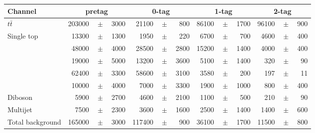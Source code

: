 \begin{table}
  \begin{tabular}{ l  rrr  rrr  rrr  rrr }
    \toprule
    Channel & \multicolumn{3}{c}{\mujets{} pretag} & \multicolumn{3}{c}{\mujets{} 0-tag} & \multicolumn{3}{c}{\mujets{} 1-tag} & \multicolumn{3}{c}{\mujets{} 2-tag} \\
    \midrule      
    $t\bar{t}$                  & 203000 &$\!\!\!\pm\!\!\!$& 3000   & 21100 &$\!\!\!\pm\!\!\!$& 800   & 86100 &$\!\!\!\pm\!\!\!$& 1700 & 96100 &$\!\!\!\pm\!\!\!$& 900  \\
    Single top                  & 13300  &$\!\!\!\pm\!\!\!$& 1300   & 1950 &$\!\!\!\pm\!\!\!$& 220    & 6700 &$\!\!\!\pm\!\!\!$& 700   & 4600 &$\!\!\!\pm\!\!\!$& 400   \\
    \wbb{}                      & 48000  &$\!\!\!\pm\!\!\!$& 4000   & 28500 &$\!\!\!\pm\!\!\!$& 2800  & 15200 &$\!\!\!\pm\!\!\!$& 1400 & 4000 &$\!\!\!\pm\!\!\!$& 400   \\
    \wc{}                       & 19000  &$\!\!\!\pm\!\!\!$& 5000   & 13200 &$\!\!\!\pm\!\!\!$& 3600  & 5100 &$\!\!\!\pm\!\!\!$& 1400  & 320 &$\!\!\!\pm\!\!\!$& 90\\
    \wlight{}                   & 62400  &$\!\!\!\pm\!\!\!$& 3300   & 58600 &$\!\!\!\pm\!\!\!$& 3100  & 3580 &$\!\!\!\pm\!\!\!$& 200   & 197 &$\!\!\!\pm\!\!\!$& 11  \\   
    \zjets{}                    & 10000  &$\!\!\!\pm\!\!\!$& 4000   & 7000 &$\!\!\!\pm\!\!\!$& 3300   & 1900 &$\!\!\!\pm\!\!\!$& 1000  & 800 &$\!\!\!\pm\!\!\!$& 400\\
    Diboson                     & 5900   &$\!\!\!\pm\!\!\!$& 2700   & 4600 &$\!\!\!\pm\!\!\!$& 2100   & 1100 &$\!\!\!\pm\!\!\!$& 500   & 210 &$\!\!\!\pm\!\!\!$& 90   \\  
    Multijet                    & 7500   &$\!\!\!\pm\!\!\!$& 2300   & 3600 &$\!\!\!\pm\!\!\!$& 1600   & 2500 &$\!\!\!\pm\!\!\!$& 1400  & 1400 &$\!\!\!\pm\!\!\!$& 600   \\
    \midrule                                                                                                                                                            
    Total background            & 165000 &$\!\!\!\pm\!\!\!$& 3000   & 117400 &$\!\!\!\pm\!\!\!$& 900  & 36100 &$\!\!\!\pm\!\!\!$& 1700 & 11500 &$\!\!\!\pm\!\!\!$& 800\\
    \midrule                                                                                                                                                            

\end{tabular}
\end{table}
